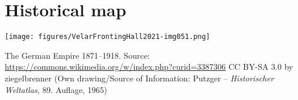 \chapter{Historical map}\label{appendix:b}

\begin{map}[H]
\texttt{[image: figures/VelarFrontingHall2021-img051.png]}
\caption[The German Empire 1871--1918]{The German Empire 1871--1918. Source: \url{https://commons.wikimedia.org/w/index.php?curid=3387306} CC BY-SA 3.0 by ziegelbrenner (Own drawing/Source of Information: Putzger – \emph{Historischer Weltatlas}, 89. Auflage, 1965)}\label{map:45}
\end{map}


